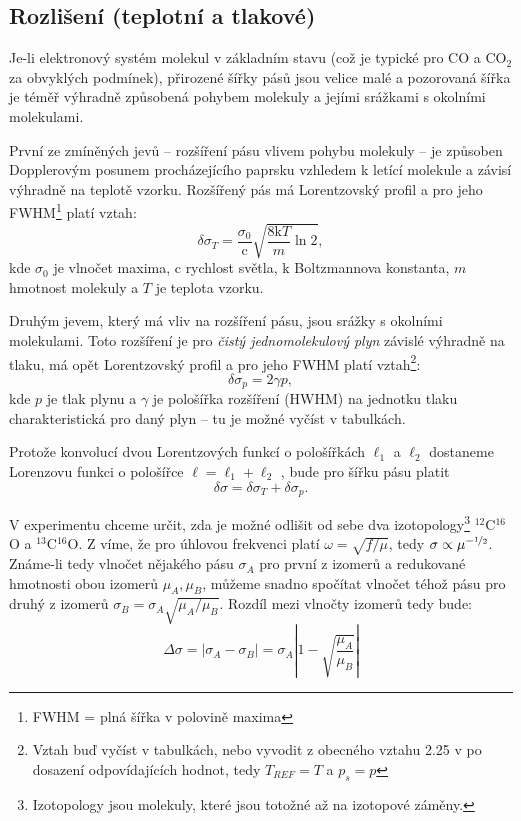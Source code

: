\documentclass[10pt,a4paper]{article}
\newcommand{\°}{\degree}
\begin{document}
\subsection{Rozlišení (teplotní a tlakové)}
Je-li elektronový systém molekul v základním stavu (což je typické pro CO a CO$_2$ za obvyklých podmínek), přirozené šířky pásů jsou velice malé a pozorovaná šířka je téměř výhradně způsobená pohybem molekuly a jejími srážkami s okolními molekulami. \cite{studijni-text}

První ze zmíněných jevů – rozšíření pásu vlivem pohybu molekuly – je způsoben Dopplerovým posunem procházejícího paprsku vzhledem k letící molekule a závisí výhradně na teplotě vzorku. Rozšířený pás má Lorentzovský profil a pro jeho FWHM\footnote{FWHM = plná šířka v polovině maxima} platí vztah:
\begin{equation}
    \delta\sigma_T = \frac{\sigma_0}{\mathrm{c}} \sqrt{\frac{8\mathrm{k}T}{m} \ln 2},
    \label{fwhm-teplota}
\end{equation}
kde $\sigma_0$ je vlnočet maxima, $\mathrm{c}$ rychlost světla, $\mathrm{k}$ Boltzmannova konstanta, $m$ hmotnost molekuly a $T$ je teplota vzorku. \cite{studijni-text}

Druhým jevem, který má vliv na rozšíření pásu, jsou srážky s okolními molekulami. Toto rozšíření je pro \textit{čistý jednomolekulový plyn} závislé výhradně na tlaku, má opět Lorentzovský profil a pro jeho FWHM platí vztah\footnote{Vztah buď vyčíst v tabulkách, nebo vyvodit z obecného vztahu 2.25 v \cite{studijni-text} po dosazení odpovídajících hodnot, tedy $T_{REF} = T$ a $p_s = p$}:
\begin{equation}
    \delta\sigma_p = 2 \gamma p,
    \label{fwhm-tlak}
\end{equation}
kde $p$ je tlak plynu a $\gamma$ je pološířka rozšíření (HWHM) na jednotku tlaku charakteristická pro daný plyn – tu je možné vyčíst v tabulkách.

Protože konvolucí dvou Lorentzových funkcí o pološířkách $\ell_1$ a $\ell_2$ dostaneme Lorenzovu funkci o pološířce $\ell = \ell_1 + \ell_2$ \cite{libretexts:lorentzian-convolution}, bude pro šířku pásu platit
\begin{equation}
    \delta\sigma = \delta\sigma_T + \delta\sigma_p.
    \label{fwhm-total}
\end{equation}

V experimentu chceme určit, zda je možné odlišit od sebe dva izotopology\footnote{Izotopology jsou molekuly, které jsou totožné až na izotopové záměny.} $^{12}$C$^{16}$O a $^{13}$C$^{16}$O. Z \cite{studijni-text} víme, že pro úhlovou frekvenci platí $\omega = \sqrt{f/\mu}$, tedy $\sigma \propto \mu^{-\nicefrac{1}{2}}$. Známe-li tedy vlnočet nějakého pásu $\sigma_A$ pro první z izomerů a redukované hmotnosti obou izomerů $\mu_A, \mu_B$, můžeme snadno spočítat vlnočet téhož pásu pro druhý z izomerů $\sigma_B = \sigma_A \sqrt{\mu_A / \mu_B}$. Rozdíl mezi vlnočty izomerů tedy bude:
\begin{equation}
    \Delta\sigma = |\sigma_A - \sigma_B| = \sigma_A \left|1 - \sqrt{\frac{\mu_A}{\mu_B}}\right|
    \label{rozdil-izotopu}
\end{equation}
\end{document}
